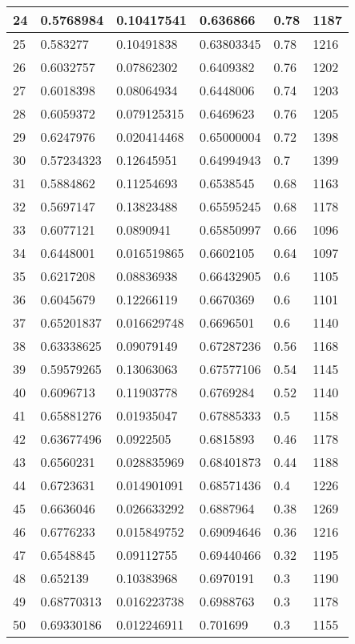 \begin{longtable}{|l|l|l|l|l|l|}
24 & 0.5768984 & 0.10417541 & 0.636866 & 0.78 & 1187 \\ \hline 
25 & 0.583277 & 0.10491838 & 0.63803345 & 0.78 & 1216 \\ \hline 
26 & 0.6032757 & 0.07862302 & 0.6409382 & 0.76 & 1202 \\ \hline 
27 & 0.6018398 & 0.08064934 & 0.6448006 & 0.74 & 1203 \\ \hline 
28 & 0.6059372 & 0.079125315 & 0.6469623 & 0.76 & 1205 \\ \hline 
29 & 0.6247976 & 0.020414468 & 0.65000004 & 0.72 & 1398 \\ \hline 
30 & 0.57234323 & 0.12645951 & 0.64994943 & 0.7 & 1399 \\ \hline 
31 & 0.5884862 & 0.11254693 & 0.6538545 & 0.68 & 1163 \\ \hline 
32 & 0.5697147 & 0.13823488 & 0.65595245 & 0.68 & 1178 \\ \hline 
33 & 0.6077121 & 0.0890941 & 0.65850997 & 0.66 & 1096 \\ \hline 
34 & 0.6448001 & 0.016519865 & 0.6602105 & 0.64 & 1097 \\ \hline 
35 & 0.6217208 & 0.08836938 & 0.66432905 & 0.6 & 1105 \\ \hline 
36 & 0.6045679 & 0.12266119 & 0.6670369 & 0.6 & 1101 \\ \hline 
37 & 0.65201837 & 0.016629748 & 0.6696501 & 0.6 & 1140 \\ \hline 
38 & 0.63338625 & 0.09079149 & 0.67287236 & 0.56 & 1168 \\ \hline 
39 & 0.59579265 & 0.13063063 & 0.67577106 & 0.54 & 1145 \\ \hline 
40 & 0.6096713 & 0.11903778 & 0.6769284 & 0.52 & 1140 \\ \hline 
41 & 0.65881276 & 0.01935047 & 0.67885333 & 0.5 & 1158 \\ \hline 
42 & 0.63677496 & 0.0922505 & 0.6815893 & 0.46 & 1178 \\ \hline 
43 & 0.6560231 & 0.028835969 & 0.68401873 & 0.44 & 1188 \\ \hline 
44 & 0.6723631 & 0.014901091 & 0.68571436 & 0.4 & 1226 \\ \hline 
45 & 0.6636046 & 0.026633292 & 0.6887964 & 0.38 & 1269 \\ \hline 
46 & 0.6776233 & 0.015849752 & 0.69094646 & 0.36 & 1216 \\ \hline 
47 & 0.6548845 & 0.09112755 & 0.69440466 & 0.32 & 1195 \\ \hline 
48 & 0.652139 & 0.10383968 & 0.6970191 & 0.3 & 1190 \\ \hline 
49 & 0.68770313 & 0.016223738 & 0.6988763 & 0.3 & 1178 \\ \hline 
50 & 0.69330186 & 0.012246911 & 0.701699 & 0.3 & 1155 \\ \hline 
\end{longtable}